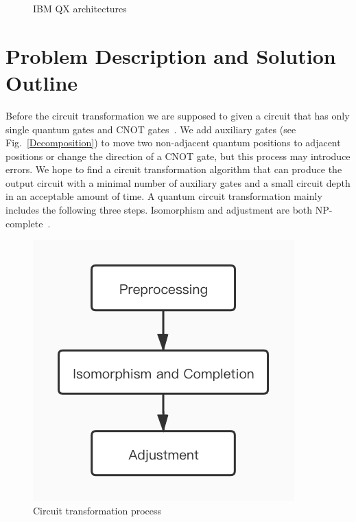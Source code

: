 \documentclass[runningheads]{llncs}
\begin{document}
\begin{figure}
{
}
\caption{IBM QX architectures}
\label{IBM}
\end{figure}


\section{Problem Description and Solution Outline}
\label{Problem Description and Solution Outline}
Before the circuit transformation we are supposed to given a circuit that has only single quantum gates and CNOT gates~\cite{1995Barenco,2005Mttnen}. We add auxiliary gates (see Fig.~\ref{Decomposition}) to move two non-adjacent quantum positions to adjacent positions or change the direction of a CNOT gate, but this process may introduce errors.
We hope to find a circuit transformation algorithm that can produce the output circuit with a minimal number of auxiliary gates and a small circuit depth in an acceptable amount of time.
A quantum circuit transformation mainly includes the following three steps. Isomorphism and adjustment are both NP-complete~\cite{2018QubitSiraichi}.
\begin{figure}[h!] 
	\centering
	\includegraphics[scale=0.4]{uml.jpg}		 
	\caption{Circuit transformation process}
	\label{processing}	
	 \end{figure}
\end{document}
